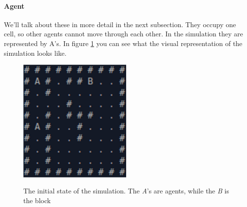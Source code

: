 \paragraph{Agent}
We'll talk about these in more detail in the next subsection. They occupy one cell, so other agents cannot move through each other. In the simulation they are represented by A's.
In figure \ref{2} you can see what the visual representation of the simulation looks like.
\begin{figure}[H]
\begin{center}
\caption{The initial state of the simulation. The \textit{A}'s are agents, while the \textit{B} is the block}
\includegraphics[width = 0.5\textwidth]{images/environment.png}
\label{2}
\end{center}
\end{figure}

